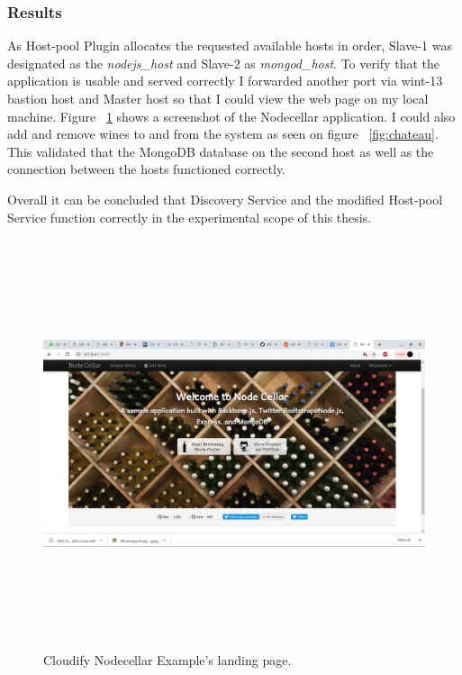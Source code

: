 \subsubsection*{Results}

As Host-pool Plugin allocates the requested available hosts in order, Slave-1 was designated as the \textit{nodejs\_host} and Slave-2 as \textit{mongod\_host}. To verify that the application is usable and served correctly I forwarded another port via wint-13 bastion host and Master host so that I could  view the web page on my local machine. Figure ~\ref{fig:nodecellar} shows a screenshot of the Nodecellar application. I could also add and remove wines to and from the system as seen on figure ~\ref{fig:chateau}. This validated that the MongoDB database on the second host as well as the connection between the hosts functioned correctly.

Overall it can be concluded that Discovery Service and the modified Host-pool Service function correctly in the experimental scope of this thesis.

 \begin{figure}[ht!]
\centering
  \includegraphics[width=12cm,height=12cm, keepaspectratio]{Nodecellarscreenshot.png}%
  \caption{Cloudify Nodecellar Example's landing page.}
  \label{fig:nodecellar}
\end{figure}

